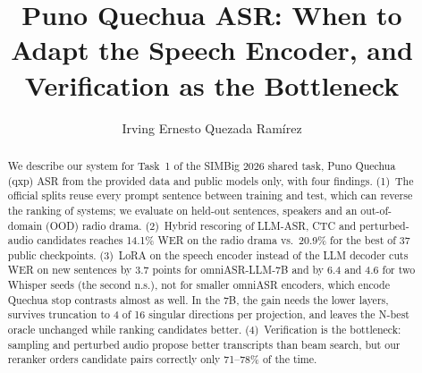 \documentclass[runningheads]{llncs}
\begin{document}
\title{Puno Quechua ASR: When to Adapt the Speech Encoder, and Verification as the Bottleneck}
\author{Irving Ernesto Quezada Ram\'irez}
\maketitle

\begin{abstract}
We describe our system for Task~1 of the SIMBig 2026 shared task, Puno Quechua (qxp) ASR from the
provided data and public models only, with four findings. (1)~The official splits reuse every
prompt sentence between training and test, which can reverse the ranking of systems; we evaluate
on held-out sentences, speakers and an out-of-domain (OOD) radio drama. (2)~Hybrid rescoring of
LLM-ASR, CTC and perturbed-audio candidates reaches 14.1\% WER on the radio drama vs.\ 20.9\%
for the best of 37 public checkpoints. (3)~LoRA on the speech encoder instead of the LLM decoder
cuts WER on new sentences by 3.7 points for omniASR-LLM-7B and by 6.4 and 4.6 for two Whisper seeds
(the second n.s.), not for smaller omniASR encoders, which encode Quechua stop
contrasts almost as well. In the 7B, the gain needs the lower layers, survives truncation to 4 of
16 singular directions per projection, and leaves the N-best oracle unchanged while ranking
candidates better. (4)~Verification is the bottleneck: sampling and perturbed audio propose better
transcripts than beam search, but our reranker orders candidate pairs correctly only 71--78\%
of the time.
\end{abstract}
\end{document}
